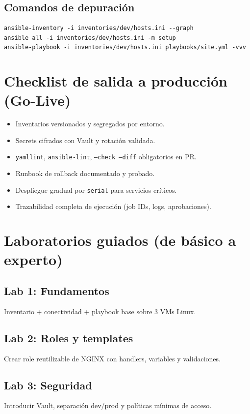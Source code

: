 \documentclass[12pt,a4paper]{article}
\begin{document}
\subsection{Comandos de depuración}
\begin{lstlisting}[caption=Debug rápido]
ansible-inventory -i inventories/dev/hosts.ini --graph
ansible all -i inventories/dev/hosts.ini -m setup
ansible-playbook -i inventories/dev/hosts.ini playbooks/site.yml -vvv
\end{lstlisting}

\section{Checklist de salida a producción (Go-Live)}

\begin{anschecklist}
\begin{itemize}
  \item Inventarios versionados y segregados por entorno.
  \item Secrets cifrados con Vault y rotación validada.
  \item \texttt{yamllint}, \texttt{ansible-lint}, \texttt{--check --diff} obligatorios en PR.
  \item Runbook de rollback documentado y probado.
  \item Despliegue gradual por \texttt{serial} para servicios críticos.
  \item Trazabilidad completa de ejecución (job IDs, logs, aprobaciones).
\end{itemize}
\end{anschecklist}

\section{Laboratorios guiados (de básico a experto)}

\subsection*{Lab 1: Fundamentos}
Inventario + conectividad + playbook base sobre 3 VMs Linux.

\subsection*{Lab 2: Roles y templates}
Crear role reutilizable de NGINX con handlers, variables y validaciones.

\subsection*{Lab 3: Seguridad}
Introducir Vault, separación dev/prod y políticas mínimas de acceso.
\end{document}
